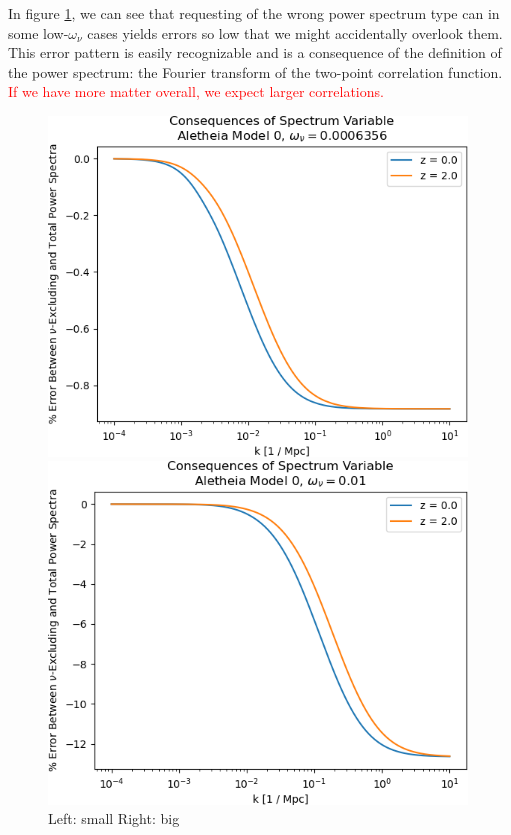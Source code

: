 \documentclass[11pt]{article}
\begin{document}
In figure \ref{fig: spectrum_type}, we can see that requesting of the wrong
power spectrum type can in some low-$\omega_\nu$ cases yields errors so low
that we might accidentally overlook them. This error pattern is easily
recognizable and is a consequence of the definition of the power spectrum: the
Fourier transform  of the two-point correlation function.
\textcolor{red}{If we
have more matter overall, we expect larger correlations.}
\begin{figure}
    \centering
    \begin{minipage}[t]{.49\textwidth}
        \raggedleft
        \includegraphics[width=0.99\textwidth]{line_by_line/spectrum_variable/low_omnuh2}
    \end{minipage}
    \begin{minipage}[t]{.49\textwidth}
        \raggedright
        \includegraphics[width=0.99\textwidth]{line_by_line/spectrum_variable/high_omnuh2}
    \end{minipage}
    \caption{Left: small Right: big}
    \label{fig: spectrum_type}
\end{figure}
\end{document}
